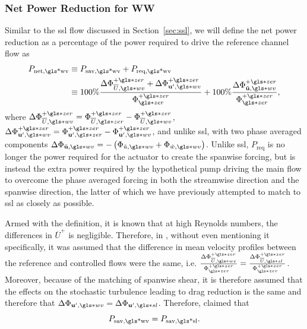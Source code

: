 \subsubsection{Net Power Reduction for WW}
Similar to the  \gls*{ssl} flow discussed in Section~\ref{sec:ssl}, we will define the net power reduction as a percentage of the power required to drive the reference channel flow as
\begin{align}
	P_\text{net,\gls*{wv}} &\equiv P_\text{sav,\gls*{wv}} +P_\text{req,\gls*{wv}} \\
			       &\equiv 100\% \frac{\Delta \Phi _{\overline{U},\gls*{wv}}\pz+\Delta \Phi_{\mathbf{u'} ,\gls*{wv}}\pz }{\Phi \zz\pz} +100\% \frac{\Delta \Phi _{\tilde{\mathbf{u} },\gls*{wv}}\pz}{\Phi \zz\pz}
,\end{align}
where $\Delta \Phi _{\overline{U},\gls*{wv}}\pz=\Phi _{\overline{U},\gls*{zer}}\pz-\Phi _{\overline{U},\gls*{wv}}\pz $, $\Delta \Phi_{\mathbf{u'} ,\gls*{wv}}\pz =\Phi_{\mathbf{u'} ,\gls*{zer}}\pz -\Phi_{\mathbf{u'} ,\gls*{wv}}\pz $, and unlike \gls*{ssl}, with two phase averaged components $\Delta \Phi _{\tilde{\mathbf{u} },\gls*{wv}}=-\left(\Phi _{\tilde{u},\gls*{wv}}+\Phi _{\tilde{w},\gls*{wv}}\right)$. Unlike \gls*{ssl}, $P_\text{req} $ is no longer the power required for the actuator to create the spanwise forcing, but is instead the extra power required by the hypothetical pump driving the main flow to overcome the phase averaged forcing in both the streamwise direction and the spanwise direction, the latter of which we have previously attempted to match to \gls*{ssl} as closely as possible.

Armed with the definition, it is known that at high Reynolds numbers, the differences in $\overline{U}^{+}$ is negligible. Therefore, in \textcite{chernyshenko2013}, without even mentioning it specifically, it was assumed that the difference in mean velocity profiles between the reference and controlled flows were the same, i.e. $\frac{\Delta \Phi _{\overline{U},\gls*{wv}}\pz}{\Phi\zz\pz }=\frac{\Delta \Phi _{\overline{U},\gls*{sl}}\pz}{\Phi \zz\pz}$. Moreover, because of the matching of spanwise shear, it is therefore assumed that the effects on the stochastic turbulence leading to drag reduction is the same and therefore that $\Delta \Phi _{\mathbf{u'} ,\gls*{wv}}=\Delta \Phi _{\mathbf{u'} ,\gls*{sl}}$. Therefore, \textcite{chernyshenko2013} claimed that
\begin{equation}
	P_\text{sav,\gls*{wv}} = P_\text{sav,\gls*{sl}}  
.\end{equation}

